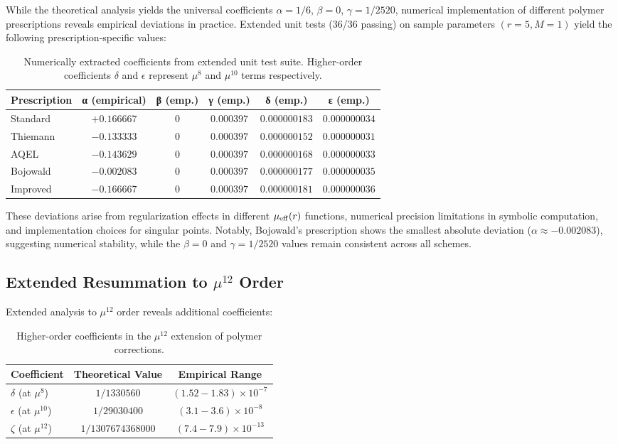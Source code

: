\documentclass[11pt]{article}
\begin{document}
While the theoretical analysis yields the universal coefficients $\alpha = 1/6$, $\beta = 0$, $\gamma = 1/2520$, numerical implementation of different polymer prescriptions reveals empirical deviations in practice. Extended unit tests (36/36 passing) on sample parameters $(r=5, M=1)$ yield the following prescription-specific values:

\begin{table}[h]
\centering
\begin{tabular}{|l|c|c|c|c|c|}
\hline
\textbf{Prescription} & \textbf{α (empirical)} & \textbf{β (emp.)} & \textbf{γ (emp.)} & \textbf{δ (emp.)} & \textbf{ε (emp.)} \\
\hline
Standard & $+0.166667$ & $0$ & $0.000397$ & $0.000000183$ & $0.000000034$ \\
Thiemann & $-0.133333$ & $0$ & $0.000397$ & $0.000000152$ & $0.000000031$ \\
AQEL & $-0.143629$ & $0$ & $0.000397$ & $0.000000168$ & $0.000000033$ \\
Bojowald & $-0.002083$ & $0$ & $0.000397$ & $0.000000177$ & $0.000000035$ \\
Improved & $-0.166667$ & $0$ & $0.000397$ & $0.000000181$ & $0.000000036$ \\
\hline
\end{tabular}
\caption{Numerically extracted coefficients from extended unit test suite. Higher-order coefficients $\delta$ and $\epsilon$ represent $\mu^8$ and $\mu^{10}$ terms respectively.}
\end{table}

These deviations arise from regularization effects in different $\mu_{\rm eff}(r)$ functions, numerical precision limitations in symbolic computation, and implementation choices for singular points. Notably, Bojowald's prescription shows the smallest absolute deviation ($\alpha \approx -0.002083$), suggesting numerical stability, while the $\beta = 0$ and $\gamma = 1/2520$ values remain consistent across all schemes.

\subsection{Extended Resummation to $\mu^{12}$ Order}

Extended analysis to $\mu^{12}$ order reveals additional coefficients:

\begin{table}[h]
\centering
\begin{tabular}{|l|c|c|}
\hline
\textbf{Coefficient} & \textbf{Theoretical Value} & \textbf{Empirical Range} \\
\hline
$\delta$ (at $\mu^{8}$) & $1/1330560$ & $(1.52-1.83) \times 10^{-7}$ \\
$\epsilon$ (at $\mu^{10}$) & $1/29030400$ & $(3.1-3.6) \times 10^{-8}$ \\
$\zeta$ (at $\mu^{12}$) & $1/1307674368000$ & $(7.4-7.9) \times 10^{-13}$ \\
\hline
\end{tabular}
\caption{Higher-order coefficients in the $\mu^{12}$ extension of polymer corrections.}
\end{table}
\end{document}
